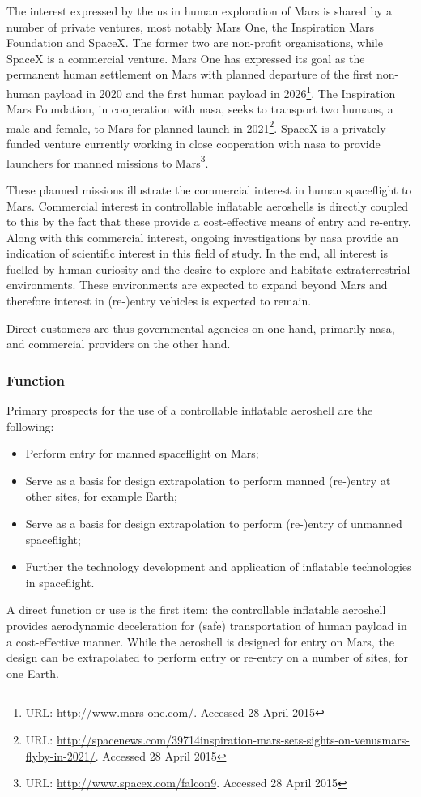 The interest expressed by the \gls{us} in human exploration of Mars is shared by a number of private ventures, most notably Mars One, the Inspiration Mars Foundation and SpaceX. The former two are non-profit organisations, while SpaceX is a commercial venture. Mars One has expressed its goal as the permanent human settlement on Mars with planned departure of the first non-human payload in 2020 and the first human payload in 2026\footnote{URL: \url{http://www.mars-one.com/}. Accessed 28 April 2015}. The Inspiration Mars Foundation, in cooperation with \gls{nasa}, seeks to transport two humans, a male and female, to Mars for planned launch in 2021\footnote{URL: \url{http://spacenews.com/39714inspiration-mars-sets-sights-on-venusmars-flyby-in-2021/}. Accessed 28 April 2015}. SpaceX is a privately funded venture currently working in close cooperation with \gls{nasa} to provide launchers for manned missions to Mars\footnote{URL: \url{http://www.spacex.com/falcon9}. Accessed 28 April 2015}.

These planned missions illustrate the commercial interest in human spaceflight to Mars. Commercial interest in controllable inflatable aeroshells is directly coupled to this by the fact that these provide a cost-effective means of entry and re-entry. Along with this commercial interest, ongoing investigations by \gls{nasa} provide an indication of scientific interest in this field of study. In the end, all interest is fuelled by human curiosity and the desire to explore and habitate extraterrestrial environments. These environments are expected to expand beyond Mars and therefore interest in (re-)entry vehicles is expected to remain.

Direct customers are thus governmental agencies on one hand, primarily \gls{nasa}, and commercial providers on the other hand. 

\subsubsection{Function}
Primary prospects for the use of a controllable inflatable aeroshell are the following:
\begin{itemize}
\item Perform entry for manned spaceflight on Mars;
\item Serve as a basis for design extrapolation to perform manned (re-)entry at other sites, for example Earth;
\item Serve as a basis for design extrapolation to perform (re-)entry of unmanned spaceflight;
\item Further the technology development and application of inflatable technologies in spaceflight.
\end{itemize}
A direct function or use is the first item: the controllable inflatable aeroshell provides aerodynamic deceleration for (safe) transportation of human payload in a cost-effective manner. While the aeroshell is designed for entry on Mars, the design can be extrapolated to perform entry or re-entry on a number of sites, for one Earth.

